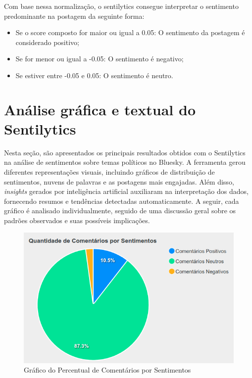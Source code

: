 \documentclass[
	12pt,				%
	oneside,			%
	a4paper,			%
	english,			%
	french,				%
	spanish,			%
	brazil				%
	]{abntex2}
\begin{document}
Com base nessa normalização, o sentilytics consegue interpretar o
sentimento predominante na postagem da seguinte forma:

\begin{itemize}
\tightlist
\item
  Se o score composto for maior ou igual a 0.05: O sentimento da
  postagem é considerado positivo;
\item
  Se for menor ou igual a -0.05: O sentimento é negativo;
\item
  Se estiver entre -0.05 e 0.05: O sentimento é neutro.
\end{itemize}

\hypertarget{anuxe1lise-gruxe1fica-e-textual-do-sentilytics}{%
\section{Análise gráfica e textual do
Sentilytics}\label{anuxe1lise-gruxe1fica-e-textual-do-sentilytics}}

Nesta seção, são apresentados os principais resultados obtidos com o
Sentilytics na análise de sentimentos sobre temas políticos no Bluesky.
A ferramenta gerou diferentes representações visuais, incluindo gráficos
de distribuição de sentimentos, nuvens de palavras e as postagens mais
engajadas. Além disso, \emph{insights} gerados por inteligência
artificial auxiliaram na interpretação dos dados, fornecendo resumos e
tendências detectadas automaticamente. A seguir, cada gráfico é
analisado individualmente, seguido de uma discussão geral sobre os
padrões observados e suas possíveis implicações.

\begin{figure}[htbp]
\hypertarget{grafico_percentual_comentarios_por_sentimento}{%
\caption{Gráfico do Percentual de Comentários por Sentimentos}\label{grafico_percentual_comentarios_por_sentimento}
\begin{center}
\includegraphics[scale=0.3]{imagens/sentilytics/estudo-caso/quantidade_comentarios_por_sentimentos.png}
\end{center}
}
\end{figure}
\end{document}
